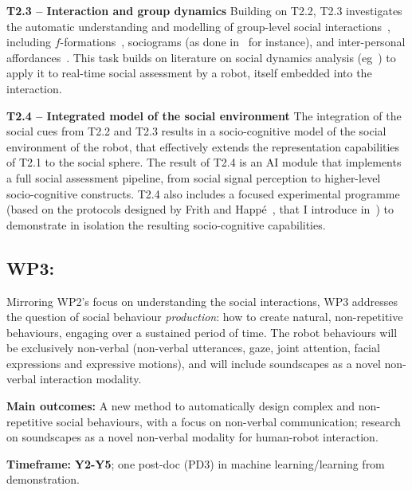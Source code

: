 \textbf{T2.3 -- Interaction and group dynamics} Building on T2.2, T2.3
investigates the automatic understanding and modelling of group-level social
interactions~\cite{tapus2019perceiving}, including
$f$-formations~\cite{marshall2011using}, sociograms (as done
in~\cite{garcia2016hybrid} for instance), and inter-personal
affordances~\cite{pandey2013affordance}. This task builds on literature on 
social dynamics analysis (eg~\cite{durantin2017social,jermann2009physical,
martinez2019collocated}) to apply it to real-time social assessment by a robot,
itself embedded into the interaction.

\textbf{T2.4 -- Integrated model of the social environment} The integration of
the social cues from T2.2 and T2.3 results in a socio-cognitive model of the
social environment of the robot, that effectively extends the representation
capabilities of T2.1 to the social sphere. The result of T2.4 is an AI module
that implements a full social assessment pipeline, from social signal perception
to higher-level socio-cognitive constructs. T2.4 also includes a
focused experimental programme (based on the protocols designed by Frith and
Happé~\cite{frith1994autism}, that I introduce in~\cite{lemaignan2015mutual}) to
demonstrate in isolation the resulting socio-cognitive capabilities.


\subsection{WP3: \textbf{\wpThree}} 

Mirroring WP2's focus on understanding the social interactions, WP3 addresses the
question of social behaviour \emph{production}: how to create natural,
non-repetitive behaviours, engaging over a sustained period of time. The robot
behaviours will be exclusively non-verbal (non-verbal utterances, gaze, joint
attention, facial expressions and expressive motions), and will include
soundscapes as a novel non-verbal interaction modality.

\begin{framed}

    \textbf{Main outcomes:} A new method to automatically design complex and
    non-repetitive social behaviours, with a focus on non-verbal communication;
    research on soundscapes as a novel non-verbal modality for human-robot
    interaction.

    \textbf{Timeframe:} \textbf{Y2-Y5}; one post-doc (PD3) in machine learning/learning from
demonstration.

\end{framed}

